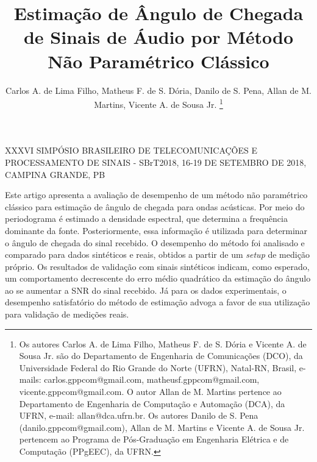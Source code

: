 \documentclass{sbrt2017port}
\begin{document}
\title{Estimação de Ângulo de Chegada de Sinais de Áudio por Método Não Paramétrico Clássico}


\author{Carlos A. de Lima Filho, Matheus F. de S. Dória, Danilo de S. Pena, Allan de M. Martins, Vicente A. de Sousa Jr.
\thanks{Os autores Carlos A. de Lima Filho, Matheus F. de S. Dória e Vicente A. de Sousa Jr. são do
 Departamento de Engenharia de Comunicações (DCO), da Universidade Federal do Rio Grande do Norte (UFRN), Natal-RN, Brasil, e-mails: carlos.gppcom@gmail.com, matheusf.gppcom@gmail.com, vicente.gppcom@gmail.com. O autor Allan de M. Martins pertence ao Departamento de Engenharia de Computação e Automação (DCA), da UFRN, e-mail: allan@dca.ufrn.br. Os autores Danilo de S. Pena (danilo.gppcom@gmail.com), Allan de M. Martins e Vicente A. de Sousa Jr. pertencem ao Programa de Pós-Graduação em Engenharia Elétrica e de Computação (PPgEEC), da UFRN.}}

\maketitle

 {XXXVI SIMPÓSIO BRASILEIRO DE TELECOMUNICAÇÕES E PROCESSAMENTO DE SINAIS - SBrT2018, 16-19 DE SETEMBRO DE 2018, CAMPINA GRANDE, PB}



\begin{resumo}
Este artigo apresenta a avaliação de desempenho de um método não paramétrico clássico para estimação de ângulo de chegada para ondas acústicas. Por meio do periodograma é estimado a densidade espectral, que determina a frequência dominante da fonte. Posteriormente, essa informação é utilizada para determinar o ângulo de chegada do sinal recebido. O desempenho do método foi analisado e comparado para dados sintéticos e reais, obtidos a partir de um \textit{setup} de medição próprio. Os resultados de validação com sinais sintéticos indicam, como esperado, um comportamento decrescente do erro médio quadrático da estimação do ângulo ao se aumentar a SNR do sinal recebido. Já para os dados experimentais, o desempenho satisfatório do método de estimação advoga a favor de sua utilização para validação de medições reais.
\end{resumo}
\end{document}
